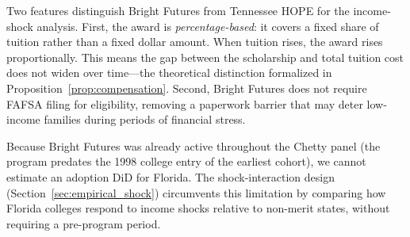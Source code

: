 Two features distinguish Bright Futures from Tennessee HOPE for the
income-shock analysis. First, the award is \emph{percentage-based}:
it covers a fixed share of tuition rather than a fixed dollar amount.
When tuition rises, the award rises proportionally. This means the
gap between the scholarship and total tuition cost does not widen
over time---the theoretical distinction formalized in
Proposition~\ref{prop:compensation}. Second, Bright Futures does not
require FAFSA filing for eligibility, removing a paperwork barrier
that may deter low-income families during periods of financial stress.

Because Bright Futures was already active throughout the Chetty panel
(the program predates the 1998 college entry of the earliest cohort),
we cannot estimate an adoption DiD for Florida. The shock-interaction
design (Section~\ref{sec:empirical_shock}) circumvents this limitation
by comparing how Florida colleges respond to income shocks relative
to non-merit states, without requiring a pre-program period.
